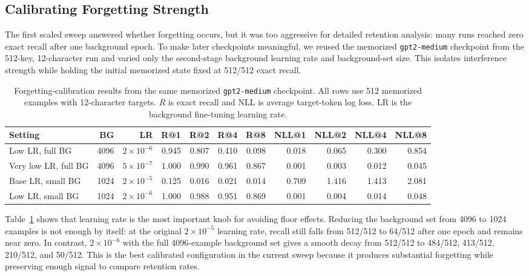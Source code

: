 \documentclass{article}
\begin{document}
\subsection{Calibrating Forgetting Strength}

The first scaled sweep answered whether forgetting occurs, but it was too aggressive for detailed retention analysis: many runs reached zero exact recall after one background epoch. To make later checkpoints meaningful, we reused the memorized \texttt{gpt2-medium} checkpoint from the 512-key, 12-character run and varied only the second-stage background learning rate and background-set size. This isolates interference strength while holding the initial memorized state fixed at 512/512 exact recall.

\begin{table}[h]
\centering
\scriptsize
\caption{Forgetting-calibration results from the same memorized \texttt{gpt2-medium} checkpoint. All rows use 512 memorized examples with 12-character targets. $R$ is exact recall and NLL is average target-token log loss. LR is the background fine-tuning learning rate.}
\label{tab:calibrated-forgetting}
\setlength{\tabcolsep}{2.5pt}
\begin{tabular}{lrrrrrrrrrr}
\toprule
Setting & BG & LR & R@1 & R@2 & R@4 & R@8 & NLL@1 & NLL@2 & NLL@4 & NLL@8 \\
\midrule
Low LR, full BG & 4096 & $2{\times}10^{-6}$ & 0.945 & 0.807 & 0.410 & 0.098 & 0.018 & 0.065 & 0.300 & 0.854 \\
Very low LR, full BG & 4096 & $5{\times}10^{-7}$ & 1.000 & 0.990 & 0.961 & 0.867 & 0.001 & 0.003 & 0.012 & 0.045 \\
Base LR, small BG & 1024 & $2{\times}10^{-5}$ & 0.125 & 0.016 & 0.021 & 0.014 & 0.709 & 1.416 & 1.413 & 2.081 \\
Low LR, small BG & 1024 & $2{\times}10^{-6}$ & 1.000 & 0.988 & 0.951 & 0.869 & 0.001 & 0.004 & 0.014 & 0.048 \\
\bottomrule
\end{tabular}
\end{table}

Table~\ref{tab:calibrated-forgetting} shows that learning rate is the most important knob for avoiding floor effects. Reducing the background set from 4096 to 1024 examples is not enough by itself: at the original $2 \times 10^{-5}$ learning rate, recall still falls from 512/512 to 64/512 after one epoch and remains near zero. In contrast, $2 \times 10^{-6}$ with the full 4096-example background set gives a smooth decay from 512/512 to 484/512, 413/512, 210/512, and 50/512. This is the best calibrated configuration in the current sweep because it produces substantial forgetting while preserving enough signal to compare retention rates.
\end{document}
